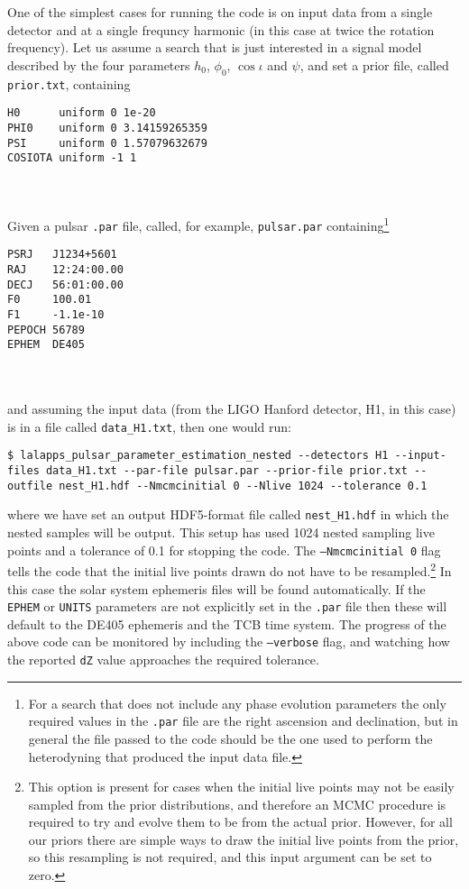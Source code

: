 One of the simplest cases for running the code is on input data from a single detector and at a single frequncy harmonic (in this
case at twice the rotation frequency). Let us assume a search that is just interested in a signal model described by the four parameters
$h_0$, $\phi_0$, $\cos{\iota}$ and $\psi$, and set a prior file, called {\tt prior.txt}, containing
\begin{lrbox}{\Lst}
\begin{lstlisting}
H0      uniform 0 1e-20
PHI0    uniform 0 3.14159265359
PSI     uniform 0 1.57079632679
COSIOTA uniform -1 1
\end{lstlisting}
\end{lrbox}
\\[5pt] \indent \fbox{\usebox{\Lst}} \\[5pt]
Given a pulsar {\tt .par} file, called, for example, {\tt pulsar.par} containing\footnote{For a search that does not include any phase evolution parameters
the only required values in the {\tt .par} file are the right ascension and declination, but in general the file passed to the code should be the one used
to perform the heterodyning that produced the input data file.}
\begin{lrbox}{\Lst}
\begin{lstlisting}
PSRJ   J1234+5601
RAJ    12:24:00.00
DECJ   56:01:00.00
F0     100.01
F1     -1.1e-10
PEPOCH 56789
EPHEM  DE405
\end{lstlisting}
\end{lrbox}
\\[5pt] \indent \fbox{\usebox{\Lst}} \\[5pt]
and assuming the input data (from the LIGO Hanford detector, H1, in this case) is in a file called {\tt data\_H1.txt}, then one would run:
\begin{lstlisting}[frame=single]
$ lalapps_pulsar_parameter_estimation_nested --detectors H1 --input-files data_H1.txt --par-file pulsar.par --prior-file prior.txt --outfile nest_H1.hdf --Nmcmcinitial 0 --Nlive 1024 --tolerance 0.1
\end{lstlisting}
where we have set an output HDF5-format file called {\tt nest\_H1.hdf} in which the nested samples will be output. This setup has used 1024 nested sampling
live points and a tolerance of 0.1 for stopping the code. The {\tt --Nmcmcinitial 0} flag tells the code that the initial live points drawn do not have to
be resampled.\footnote{This option is present for cases when the initial live points may not be easily sampled from the prior distributions, and therefore
an MCMC procedure is required to try and evolve them to be from the actual prior. However, for all our priors there are simple ways to draw the initial
live points from the prior, so this resampling is not required, and this input argument can be set to zero.} In this case the solar system ephemeris files
will be found automatically. If the {\tt EPHEM} or {\tt UNITS} parameters are not explicitly set in the {\tt .par} file then these will default to the
DE405 ephemeris and the TCB time system. The progress of the above code can be monitored by including the {\tt --verbose} flag, and watching how the
reported {\tt dZ} value approaches the required tolerance.


